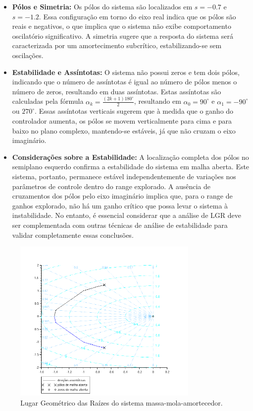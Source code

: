 \begin{itemize}
    \item \textbf{Pólos e Simetria:}
          Os pólos do sistema são localizados em \( s = -0.7 \) e \( s = -1.2 \). Essa configuração em torno do eixo real indica que os pólos são reais e negativos, o que implica que o sistema não exibe comportamento oscilatório significativo. A simetria sugere que a resposta do sistema será caracterizada por um amortecimento subcrítico, estabilizando-se sem oscilações.

    \item \textbf{Estabilidade e Assíntotas:}
          O sistema não possui zeros e tem dois pólos, indicando que o número de assíntotas é igual ao número de pólos menos o número de zeros, resultando em duas assíntotas. Estas assíntotas são calculadas pela fórmula \( \alpha_k = \frac{(2k + 1) 180^\circ}{2} \), resultando em \( \alpha_0 = 90^\circ \) e \( \alpha_1 = -90^\circ \) ou \( 270^\circ \). Essas assíntotas verticais sugerem que à medida que o ganho do controlador aumenta, os pólos se movem verticalmente para cima e para baixo no plano complexo, mantendo-se estáveis, já que não cruzam o eixo imaginário.

    \item \textbf{Considerações sobre a Estabilidade:}
          A localização completa dos pólos no semiplano esquerdo confirma a estabilidade do sistema em malha aberta. Este sistema, portanto, permanece estável independentemente de variações nos parâmetros de controle dentro do range explorado. A ausência de cruzamentos dos pólos pelo eixo imaginário implica que, para o range de ganhos explorado, não há um ganho crítico que possa levar o sistema à instabilidade. No entanto, é essencial considerar que a análise de LGR deve ser complementada com outras técnicas de análise de estabilidade para validar completamente essas conclusões.
\end{itemize}

\begin{figure}[h]
    \centering
    \includegraphics[width=0.8\textwidth]{atividades/7-atividade/assets/lgr.png}
    \caption{Lugar Geométrico das Raízes do sistema massa-mola-amortecedor.}
    \label{fig:LGR}
\end{figure}

